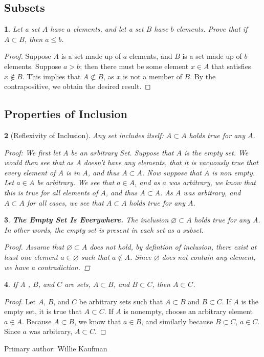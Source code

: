 \documentclass{book}
\renewcommand{\emptyset}{\varnothing}
\newtheorem{majorEx}{}[section]
\begin{document}
			\subsection{Subsets}%
				\begin{majorEx}%
					Let a set $ A $ have $a$ elements, and let a set $B$ have $b$ elements. Prove that if $A \subset B $, then $a\leq b$.
				\end{majorEx}
				\begin{proof}
					Suppose  $ A $ is a set made up of $a$ elements, and $B$ is a set made up of $b$ elements. Suppose $a > b$; then there must be some element $x \in A$ that satisfies $x \notin B$. This implies that $A \not\subset B$, as $x$ is not a member of $B$. By the contrapositive, we obtain the desired result.
				\end{proof}
			\subsection{Properties of Inclusion}%
				\begin{majorEx}[Reflexivity of Inclusion]%
                Any set includes itself: $A \subset A$ holds true for any $A$.

Proof: We first let $A$ be an arbitrary Set. Suppose that $A$ is the empty set. We would then see that as $A$ doesn't have any elements, that it is vacuously true that every element of $A$ is in $A$, and thus  $A \subset A$. Now suppose that $A$ is non empty. Let $a \in A$ be arbitrary. We see that $a \in A$, and as $a$ was arbitrary, we know that this is true for all elements of $A$, and thus $A \subset A$. As $A$ was arbitrary, and $A \subset A$ for all cases, we see that $A \subset A$ holds true for any $A$.
				\end{majorEx}
				\begin{majorEx}%
					\textbf{\textit{The Empty Set Is Everywhere.}} The inclusion $\emptyset \subset A$ holds true for any A. In other words, the empty set is present in each set as a subset.
                    \begin{proof}
                    Assume that $\emptyset \subset A$ does not hold, by defintion of inclusion, there exist at least one element $a \in \emptyset$ such that $a \not\in A$. Since $\emptyset$ does not contain any element, we have a contradiction.
                    \end{proof}
				\end{majorEx}
				\begin{majorEx}%
					If A , $B$, and $C$ are sets, $A \subset B$, and $B \subset C$, then $A \subset C$. 
				\end{majorEx}
                \begin{proof}
                Let $A$, $B$, and $C$ be arbitrary sets such that $A \subset B$ and $B \subset C$. If $A$ is the empty set, it is true that $A \subset C$. If $A$ is nonempty, choose an arbitrary element $a \in A$. Because $A \subset B$, we know that $a \in B$, and similarly because  $B \subset C$, $a \in C$. Since $a$ was arbitrary, $A \subset C$. \newline
                \end{proof}
      		 Primary author: Willie Kaufman
\end{document}
